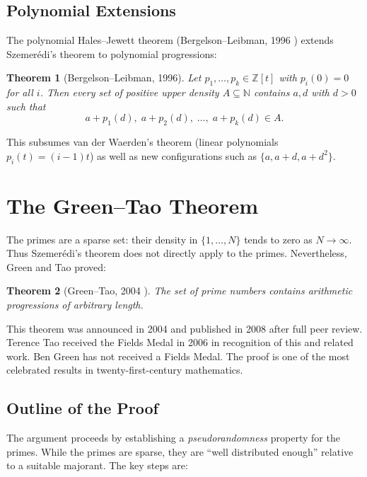 \documentclass[12pt,a4paper]{amsart}
\newtheorem{theorem}{Theorem}[section]
\theoremstyle{definition}
\newcommand{\N}{\mathbb{N}}
\newcommand{\Z}{\mathbb{Z}}
\begin{document}
\subsection{Polynomial Extensions}

The polynomial Hales--Jewett theorem (Bergelson--Leibman, 1996 \cite{BergelsonLeibman1996})
extends Szemer\'edi's theorem to polynomial progressions:

\begin{theorem}[Bergelson--Leibman, 1996]
Let $p_1, \ldots, p_k \in \Z[t]$ with $p_i(0) = 0$ for all $i$. Then every set of
positive upper density $A \subseteq \N$ contains $a, d$ with $d > 0$ such that
\[
  a + p_1(d),\; a + p_2(d),\; \ldots,\; a + p_k(d) \in A.
\]
\end{theorem}

This subsumes van der Waerden's theorem (linear polynomials $p_i(t) = (i-1)t$) as well
as new configurations such as $\{a, a+d, a+d^2\}$.

\section{The Green--Tao Theorem}\label{sec:green-tao}

The primes are a sparse set: their density in $\{1,\ldots,N\}$ tends to zero as
$N \to \infty$. Thus Szemer\'edi's theorem does not directly apply to the primes.
Nevertheless, Green and Tao proved:

\begin{theorem}[Green--Tao, 2004 \cite{GreenTao2008}]\label{thm:gt}
The set of prime numbers contains arithmetic progressions of arbitrary length.
\end{theorem}

This theorem was announced in 2004 and published in 2008 after full peer review.
Terence Tao received the Fields Medal in 2006 in recognition of this and related
work.  Ben Green has not received a Fields Medal. The proof is one of the most celebrated results in
twenty-first-century mathematics.

\subsection{Outline of the Proof}

The argument proceeds by establishing a \emph{pseudorandomness} property for the primes.
While the primes are sparse, they are ``well distributed enough'' relative to a suitable
majorant. The key steps are:
\end{document}
